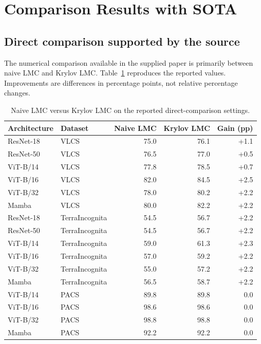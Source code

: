 \documentclass[11pt,a4paper]{article}
\begin{document}
\section{Comparison Results with SOTA}

\subsection{Direct comparison supported by the source}
The numerical comparison available in the supplied paper is primarily between naive LMC and Krylov LMC. Table~\ref{tab:direct_comparison} reproduces the reported values. Improvements are differences in percentage points, not relative percentage changes.

\begin{table}[H]
\centering
\caption{Naive LMC versus Krylov LMC on the reported direct-comparison settings.}
\label{tab:direct_comparison}
\small
\begin{tabular}{llrrr}
\toprule
Architecture & Dataset & Naive LMC & Krylov LMC & Gain (pp) \\
\midrule
ResNet-18 & VLCS & 75.0 & 76.1 & +1.1 \\
ResNet-50 & VLCS & 76.5 & 77.0 & +0.5 \\
ViT-B/14 & VLCS & 77.8 & 78.5 & +0.7 \\
ViT-B/16 & VLCS & 82.0 & 84.5 & +2.5 \\
ViT-B/32 & VLCS & 78.0 & 80.2 & +2.2 \\
Mamba & VLCS & 80.0 & 82.2 & +2.2 \\
\midrule
ResNet-18 & TerraIncognita & 54.5 & 56.7 & +2.2 \\
ResNet-50 & TerraIncognita & 54.5 & 56.7 & +2.2 \\
ViT-B/14 & TerraIncognita & 59.0 & 61.3 & +2.3 \\
ViT-B/16 & TerraIncognita & 57.0 & 59.2 & +2.2 \\
ViT-B/32 & TerraIncognita & 55.0 & 57.2 & +2.2 \\
Mamba & TerraIncognita & 56.5 & 58.7 & +2.2 \\
\midrule
ViT-B/14 & PACS & 89.8 & 89.8 & 0.0 \\
ViT-B/16 & PACS & 98.6 & 98.6 & 0.0 \\
ViT-B/32 & PACS & 98.8 & 98.8 & 0.0 \\
Mamba & PACS & 92.2 & 92.2 & 0.0 \\
\bottomrule
\end{tabular}
\end{table}
\end{document}
